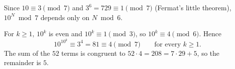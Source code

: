 Since $10\equiv3\pmod7$ and $3^6=729\equiv1\pmod7$ (Fermat's little theorem), $10^{N}\bmod7$ depends only on $N\bmod6$.

For $k\ge1$, $10^k$ is even and $10^k\equiv1\pmod3$, so $10^k\equiv4\pmod6$. Hence
\[10^{10^k}\equiv3^4=81\equiv4\pmod7\qquad\text{for every }k\ge1 .\]
The sum of the $52$ terms is congruent to $52\cdot4=208=7\cdot29+5$, so the remainder is $\boxed{5}$.

